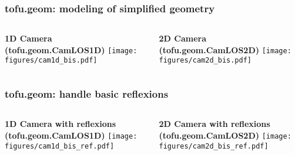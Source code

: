 \documentclass[10pt]{beamer}
\begin{document}
\begin{frame}
\frametitle{tofu.geom: modeling of simplified geometry}
\begin{columns}
		\begin{column}{0.5\textwidth}
		\begin{center}
		\textbf{1D Camera\\(tofu.geom.CamLOS1D)}
		\texttt{[image: figures/cam1d\_bis.pdf]}
	\end{center}
		\end{column}
		\pause
		\begin{column}{0.5\textwidth}
		\begin{center}
		\textbf{2D Camera\\(tofu.geom.CamLOS2D)}
		\texttt{[image: figures/cam2d\_bis.pdf]}
	\end{center}	
		\end{column}
	\end{columns}
\end{frame}

\begin{frame}
\frametitle{tofu.geom: handle basic reflexions}
\begin{columns}
		\begin{column}{0.5\textwidth}
		\begin{center}
		\textbf{1D Camera with reflexions\\(tofu.geom.CamLOS1D)}
		\texttt{[image: figures/cam1d\_bis\_ref.pdf]}
	\end{center}
		\end{column}
		\begin{column}{0.5\textwidth}
		\begin{center}
		\textbf{2D Camera with reflexions\\(tofu.geom.CamLOS2D)}
		\texttt{[image: figures/cam2d\_bis\_ref.pdf]}
	\end{center}	
		\end{column}
	\end{columns}
\end{frame}
\end{document}
